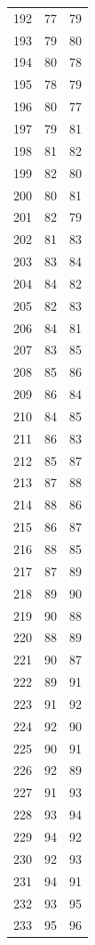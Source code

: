 \documentclass[a4paper,11pt]{article}
\begin{document}
\begin{center}
\begin{longtable}{|R{1.5cm}|R{1.5cm}|R{1.5cm}|}
  192 &   77 &   79 \\
  193 &   79 &   80 \\
  194 &   80 &   78 \\
  195 &   78 &   79 \\
  196 &   80 &   77 \\
  197 &   79 &   81 \\
  198 &   81 &   82 \\
  199 &   82 &   80 \\
  200 &   80 &   81 \\
  201 &   82 &   79 \\
  202 &   81 &   83 \\
  203 &   83 &   84 \\
  204 &   84 &   82 \\
  205 &   82 &   83 \\
  206 &   84 &   81 \\
  207 &   83 &   85 \\
  208 &   85 &   86 \\
  209 &   86 &   84 \\
  210 &   84 &   85 \\
  211 &   86 &   83 \\
  212 &   85 &   87 \\
  213 &   87 &   88 \\
  214 &   88 &   86 \\
  215 &   86 &   87 \\
  216 &   88 &   85 \\
  217 &   87 &   89 \\
  218 &   89 &   90 \\
  219 &   90 &   88 \\
  220 &   88 &   89 \\
  221 &   90 &   87 \\
  222 &   89 &   91 \\
  223 &   91 &   92 \\
  224 &   92 &   90 \\
  225 &   90 &   91 \\
  226 &   92 &   89 \\
  227 &   91 &   93 \\
  228 &   93 &   94 \\
  229 &   94 &   92 \\
  230 &   92 &   93 \\
  231 &   94 &   91 \\
  232 &   93 &   95 \\
  233 &   95 &   96 \\

\end{longtable}
\end{center}
\end{document}
